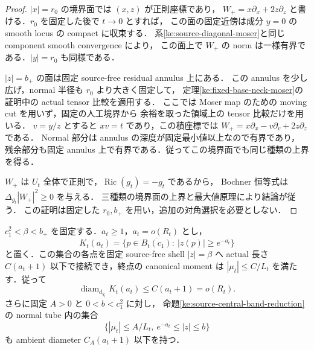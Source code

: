\begin{proof}
$|x|=r_0$ の境界面では $(x,z)$ が正則座標であり，
$W_+=x\partial_x+2z\partial_z$ と書ける．$r_0$ を固定した後で $t\to0$ とすれば，
この面の固定近傍は成分 $y=0$ の smooth locus の compact に収束する．
系\ref{ke:source-diagonal-moser}と同じ component smooth convergence により，
この面上で $W_+$ の norm は一様有界である．$|y|=r_0$ も同様である．

$|z|=b_+$ の面は固定 source-free residual annulus 上にある．
この annulus を少し広げ，normal 半径も $r_0$ より大きく固定して，
定理\ref{ke:fixed-base-neck-moser}の証明中の actual tensor 比較を適用する．
ここでは Moser map のための moving cut を用いず，固定の人工境界から
余裕を取った領域上の tensor 比較だけを用いる．
$v=y/z$ とすると $xv=t$ であり，この積座標では
$W_+=x\partial_x-v\partial_v+2z\partial_z$ である．
Normal 部分は annulus の深度が固定最小値以上なので有界であり，
残余部分も固定 annulus 上で有界である．従ってこの境界面でも同じ種類の上界を得る．

$W_+$ は $U_t$ 全体で正則で，$\operatorname{Ric}(g_t)=-g_t$ であるから，
Bochner 恒等式は $\Delta_{g_t}|W_+|^2\ge0$ を与える．
三種類の境界面の上界と最大値原理により結論が従う．
この証明は固定した $r_0,b_+$ を用い，追加の対角選択を必要としない．
\end{proof}

\begin{proposition}
\label{ke:source-sublog-residual-connectors}
$c_1^2<\beta<b_+$ を固定する．$a_t\ge1$，$a_t=o(R_t)$ とし，
\[
 K_t(a_t)=\{p\in\overline{B_t(c_1)}:\ |z(p)|\ge e^{-a_t}\}
\]
と置く．この集合の各点を固定 source-free shell $|z|=\beta$ へ
actual 長さ $C(a_t+1)$ 以下で接続でき，終点の canonical moment は
$|\mu_t|\le C/L_t$ を満たす．従って
\[
 \operatorname{diam}_{d_{g_t}}K_t(a_t)\le C(a_t+1)=o(R_t).
\]
さらに固定 $A>0$ と $0<b<c_1^2$ に対し，
命題\ref{ke:source-central-band-reduction}の normal tube 内の集合
\[
 \{|\mu_t|\le A/L_t,\ e^{-a_t}\le|z|\le b\}
\]
も ambient diameter $C_A(a_t+1)$ 以下を持つ．
\end{proposition}

